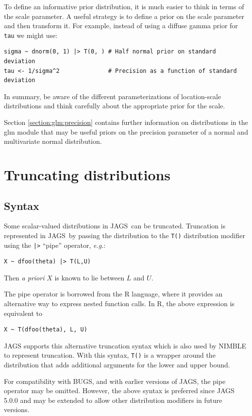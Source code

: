 \documentclass[11pt, a4paper, titlepage]{report}
\newcommand{\JAGS}{\textsf{JAGS}}
\begin{document}
To define an informative prior distribution, it is much easier to
think in terms of the scale parameter. A useful strategy is to define
a prior on the scale parameter and then transform it. For example,
instead of using a diffuse gamma prior for \texttt{tau} we might use:
\begin{verbatim}
sigma ~ dnorm(0, 1) |> T(0, ) # Half normal prior on standard deviation
tau <- 1/sigma^2              # Precision as a function of standard deviation
\end{verbatim}

In summary, be aware of the different parameterizations of
location-scale distributions and think carefully about the appropriate
prior for the scale.

Section \ref{section:glm:precision} contains further information on
distributions in the \textsf{glm} module that may be useful priors on
the precision parameter of a normal and multivariate normal
distribution.

\section{Truncating distributions}
\label{section:truncation}

\subsection{Syntax}

Some scalar-valued distributions in \JAGS\ can be truncated.
Truncation is represented in \JAGS\ by passing the distribution to the
\texttt{T()} distribution modifier using the \texttt{|>} ``pipe''
operator, {\em e.g.}:
\begin{verbatim}
X ~ dfoo(theta) |> T(L,U)
\end{verbatim}
Then {\em a priori} $X$ is known to lie between $L$ and $U$.

The pipe operator is borrowed from the R language, where it provides
an alternative way to express nested function calls. In R, the above
expression is equivalent to
\begin{verbatim}
X ~ T(dfoo(theta), L, U)
\end{verbatim}
JAGS supports this alternative truncation syntax which is also used by
NIMBLE to represent truncation.  With this syntax, \texttt{T()} is a
wrapper around the distribution that adds additional arguments for the
lower and upper bound.

For compatibility with BUGS, and with earlier versions of JAGS, the pipe
operator may be omitted. However, the above syntax is preferred since
JAGS 5.0.0 and may be extended to allow other distribution modifiers
in future versions.
\end{document}
